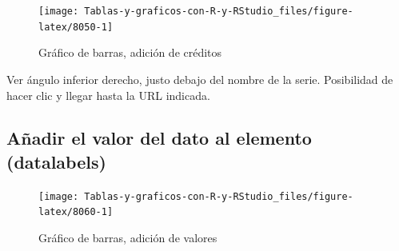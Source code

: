 \documentclass[
]{book}
\newenvironment{Shaded}{\begin{snugshade}}{\end{snugshade}}
\newcommand{\AttributeTok}[1]{\textcolor[rgb]{0.77,0.63,0.00}{#1}}
\newcommand{\ConstantTok}[1]{\textcolor[rgb]{0.00,0.00,0.00}{#1}}
\newcommand{\FunctionTok}[1]{\textcolor[rgb]{0.00,0.00,0.00}{#1}}
\newcommand{\NormalTok}[1]{#1}
\newcommand{\SpecialCharTok}[1]{\textcolor[rgb]{0.00,0.00,0.00}{#1}}
\newcommand{\StringTok}[1]{\textcolor[rgb]{0.31,0.60,0.02}{#1}}
\begin{document}
\begin{figure}[H]

{\centering \texttt{[image: Tablas-y-graficos-con-R-y-RStudio\_files/figure-latex/8050-1]} 

}

\caption{Gráfico de barras, adición de créditos}\label{fig:8050}
\end{figure}

Ver ángulo inferior derecho, justo debajo del nombre de la serie. Posibilidad de hacer clic y llegar hasta la URL indicada.

\hypertarget{auxf1adir-el-valor-del-dato-al-elemento-datalabels}{%
\subsection{Añadir el valor del dato al elemento (datalabels)}\label{auxf1adir-el-valor-del-dato-al-elemento-datalabels}}

\begin{Shaded}
\end{Shaded}

\begin{figure}[H]

{\centering \texttt{[image: Tablas-y-graficos-con-R-y-RStudio\_files/figure-latex/8060-1]} 

}

\caption{Gráfico de barras, adición de valores}\label{fig:8060}
\end{figure}
\end{document}
